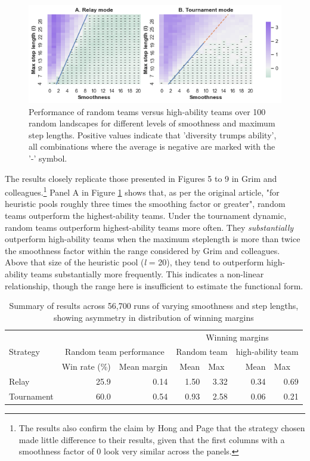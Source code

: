  \begin{figure}
   \includegraphics[width=\linewidth]{Fig69.png}
   \caption{Performance of random teams versus high-ability teams over 100 random landscapes for different levels of smoothness and maximum step lengths. Positive values indicate that 'diversity trumps ability', all combinations where the average is negative are marked with the '-' symbol.}
   \label{fig:Grim69}
 \end{figure}
 
 The results closely replicate those presented in Figures 5 to 9 in Grim and colleagues.\footnote{The results also confirm the claim by Hong and Page that the strategy chosen made little difference to their results, given that the first columns with a smoothness factor of 0 look very similar across the panels.} Panel A in Figure \ref{fig:Grim69} shows that, as per the original article, "for heuristic pools roughly three times the smoothing factor or greater", random teams outperform the highest-ability teams. Under the tournament dynamic, random teams outperform highest-ability teams more often. They \textit{substantially} outperform high-ability teams when the maximum steplength is more than twice the smoothness factor within the range considered by Grim and colleagues. Above that size of the heuristic pool (\textit{l} = 20), they tend to outperform high-ability teams substantially more frequently. This indicates a non-linear relationship, though the range here is insufficient to estimate the functional form. \\
 
 \begin{table}
  \centering
  \caption{Summary of results across 56,700 runs of varying smoothness and step lengths, showing asymmetry in distribution of winning margins}
  \label{tab:win_comp}
\begin{tabular}{lrrrrrr}
  \toprule
  \multicolumn{3}{c}{}& \multicolumn{4}{c|}{Winning margins}\\
  Strategy & \multicolumn{2}{|c|}{Random team performance} & \multicolumn{2}{l|}{Random team} & \multicolumn{2}{l|}{high-ability team}\\
       &  \multicolumn{1}{|l}{Win rate (\%)} &  \multicolumn{1}{l|}{Mean margin} &  Mean &  \multicolumn{1}{l|}{Max} &  Mean &  \multicolumn{1}{l|}{Max} \\
  \midrule
       Relay &          25.9 &            0.14 &         1.50 &        3.32 &       0.34 &      0.69 \\
   Tournament &          60.0 &            0.54 &         0.93 &        2.58 &       0.06 &      0.21 \\
  \bottomrule
  \end{tabular}
\end{table} 
 
